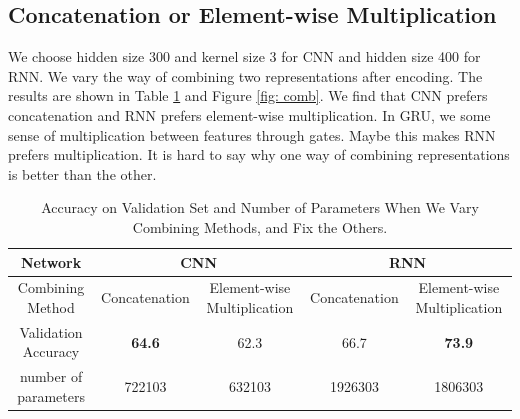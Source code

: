 \documentclass[10pt,a4paper]{article}
\begin{document}
\subsection{Concatenation or Element-wise Multiplication}
We choose hidden size 300 and kernel size 3 for CNN and hidden size 400 for RNN. We vary the way of combining two representations after encoding. The results are shown in Table \ref{tab: comb} and Figure \ref{fig: comb}. We find that CNN prefers concatenation and RNN prefers element-wise multiplication. In GRU, we some sense of multiplication between features through gates. Maybe this makes RNN prefers multiplication. It is hard to say why one way of combining representations is better than the other.
\begin{table}[!ht]
\centering
\begin{tabular}{|c|c|c|c|c|}
\hline
Network & \multicolumn{2}{|c|}{CNN} & \multicolumn{2}{|c|}{RNN} \\ \hline
Combining Method & Concatenation & Element-wise Multiplication & Concatenation & Element-wise Multiplication \\ \hline
Validation Accuracy & \textbf{64.6} & 62.3 & 66.7 & \textbf{73.9}\\ \hline
number of parameters & 722103 & 632103 & 1926303 &1806303 \\ \hline
\end{tabular}
\caption{\label{tab: comb}Accuracy on Validation Set and Number of Parameters When We Vary Combining Methods, and Fix the Others.}
\end{table}
\end{document}
